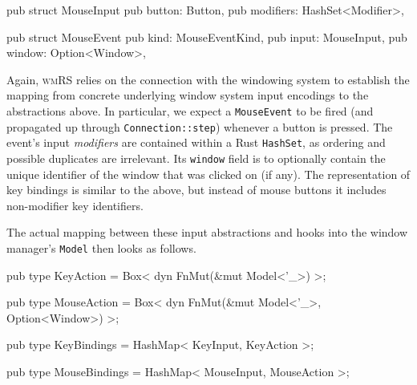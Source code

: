 \begin{rustblock}
  pub struct MouseInput {
    pub button: Button,
    pub modifiers: HashSet<Modifier>,
  }
\end{rustblock}

\begin{rustblock}
  pub struct MouseEvent {
    pub kind: MouseEventKind,
    pub input: MouseInput,
    pub window: Option<Window>,
  }
\end{rustblock}

Again,  \textsc{wmRS} relies  on the  connection  with the  windowing system  to
establish the mapping from concrete  underlying window system input encodings to
the abstractions  above. In  particular, we expect  a \texttt{MouseEvent}  to be
fired (and propagated up through \texttt{Connection::step}) whenever a button is
pressed.  The  event's input  \textit{modifiers}  are  contained within  a  Rust
\texttt{HashSet},  as  ordering  and  possible duplicates  are  irrelevant.  Its
\texttt{window}  field is  to optionally  contain the  unique identifier  of the
window  that was  clicked on  (if any).  The representation  of key  bindings is
similar to the above, but instead  of mouse buttons it includes non-modifier key
identifiers.

The actual  mapping between these input  abstractions and hooks into  the window
manager's \texttt{Model} then looks as follows.

\begin{rustblock}
  pub type KeyAction = Box<
    dyn FnMut(&mut Model<'_>)
  >;
\end{rustblock}
\begin{rustblock}
  pub type MouseAction = Box<
    dyn FnMut(&mut Model<'_>, Option<Window>)
  >;
\end{rustblock}
\begin{rustblock}
  pub type KeyBindings = HashMap<
    KeyInput, 
    KeyAction
  >;
\end{rustblock}
\begin{rustblock}
  pub type MouseBindings = HashMap<
    MouseInput, 
    MouseAction
  >;
\end{rustblock}

